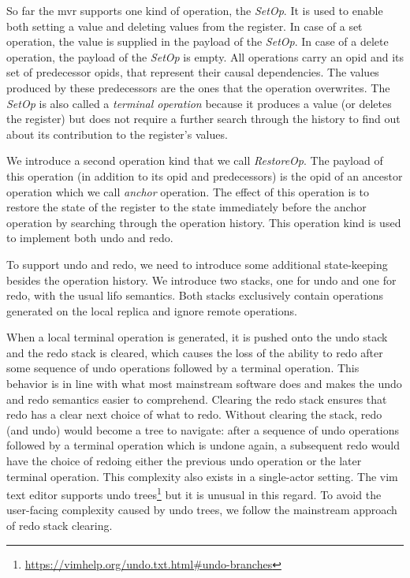 \documentclass[sigplan,natbib=false,review]{acmart}
\newcommand{\setopkind}{\textit{SetOp}}
\newcommand{\restopkind}{\textit{RestoreOp}}
\begin{document}

So far the \gls*{mvr} supports one kind of operation, the \setopkind{}.
It is used to enable both setting a value and deleting values from the register.
In case of a set operation, the value is supplied in the payload of the \setopkind{}.
In case of a delete operation, the payload of the \setopkind{} is empty.
All operations carry an \gls*{opid} and its set of predecessor \glspl*{opid},
that represent their causal dependencies.
The values produced by these predecessors are the ones that the operation
overwrites.
The \setopkind{} is also called a \emph{terminal operation}
because it produces a value (or deletes the register) but does not require a further
search through the history to find out about its contribution to the register's
values.

We introduce a second operation kind that we call \restopkind{}.
The payload of this operation (in addition to its \gls*{opid} and predecessors)
is the \gls*{opid} of an ancestor operation which we call \emph{anchor} operation.
The effect of this operation is to restore the state of the register to the
state immediately before the anchor operation by searching through the
operation history.
This operation kind is used to implement both undo and redo.

To support undo and redo, we need to introduce some additional state-keeping
besides the operation history.
We introduce two stacks, one for undo and one for redo, with the usual
\acrlong{lifo} semantics.
Both stacks exclusively contain operations generated on the local replica and
ignore remote operations.

When a local terminal operation is generated, it is pushed onto the undo stack and
the redo stack is cleared, which causes the loss of the ability to redo after
some sequence of undo operations followed by a terminal operation.
This behavior is in line with what most mainstream software does and makes the
undo and redo semantics easier to comprehend.
Clearing the redo stack ensures that redo has a clear next choice of what to redo.
Without clearing the stack, redo (and undo) would become a tree to navigate:
after a sequence of undo operations followed by a terminal operation
which is undone again, a subsequent redo would have the choice of redoing
either the previous undo operation or the later terminal operation.
This complexity also exists in a single-actor setting.
The vim text editor supports undo trees\footnote{
  \url{https://vimhelp.org/undo.txt.html\#undo-branches}
} but it is unusual in this regard.
To avoid the user-facing complexity caused by undo trees,
we follow the mainstream approach of redo stack clearing.
\end{document}
